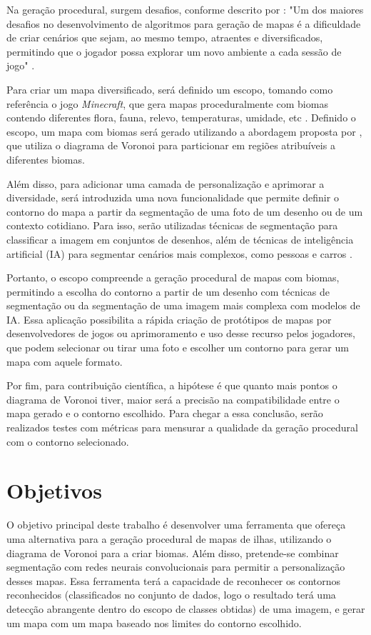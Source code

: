 Na geração procedural, surgem desafios, conforme descrito por : "Um dos maiores desafios no desenvolvimento de algoritmos para geração de mapas é a dificuldade de criar cenários que sejam, ao mesmo tempo, atraentes e diversificados, permitindo que o jogador possa explorar um novo ambiente a cada sessão de jogo" \cite{geracao_procedural_jogos_2d}.

Para criar um mapa diversificado, será definido um escopo, tomando como referência o jogo \textit{Minecraft}, que gera mapas proceduralmente com biomas contendo diferentes flora, fauna, relevo, temperaturas, umidade, etc \cite{mojang}. Definido o escopo, um mapa com biomas será gerado utilizando a abordagem proposta por , que utiliza o diagrama de Voronoi para particionar em regiões atribuíveis a diferentes biomas.

Além disso, para adicionar uma camada de personalização e aprimorar a diversidade, será introduzida uma nova funcionalidade que permite definir o contorno do mapa a partir da segmentação de uma foto de um desenho ou de um contexto cotidiano. Para isso, serão utilizadas técnicas de segmentação para classificar a imagem em conjuntos de desenhos, além de técnicas de inteligência artificial (IA) para segmentar cenários mais complexos, como pessoas e carros \cite{dp_semantic_segmantation, saiwa}.

Portanto, o escopo compreende a geração procedural de mapas com biomas, permitindo a escolha do contorno a partir de um desenho com técnicas de segmentação ou da segmentação de uma imagem mais complexa com modelos de IA. Essa aplicação possibilita a rápida criação de protótipos de mapas por desenvolvedores de jogos ou aprimoramento e uso desse recurso pelos jogadores, que podem selecionar ou tirar uma foto e escolher um contorno para gerar um mapa com aquele formato.

Por fim, para contribuição científica, a hipótese é que quanto mais pontos o diagrama de Voronoi tiver, maior será a precisão na compatibilidade entre o mapa gerado e o contorno escolhido. Para chegar a essa conclusão, serão realizados testes com métricas para mensurar a qualidade da geração procedural com o contorno selecionado.

\section{Objetivos}

O objetivo principal deste trabalho é desenvolver uma ferramenta que ofereça uma alternativa para a geração procedural de mapas de ilhas, utilizando o diagrama de Voronoi para a criar biomas. Além disso, pretende-se combinar segmentação com redes neurais convolucionais para permitir a personalização desses mapas. Essa ferramenta terá a capacidade de reconhecer os contornos reconhecidos (classificados no conjunto de dados, logo o resultado terá uma detecção abrangente dentro do escopo de classes obtidas) de uma imagem, e gerar um mapa com um mapa baseado nos limites do contorno escolhido.

